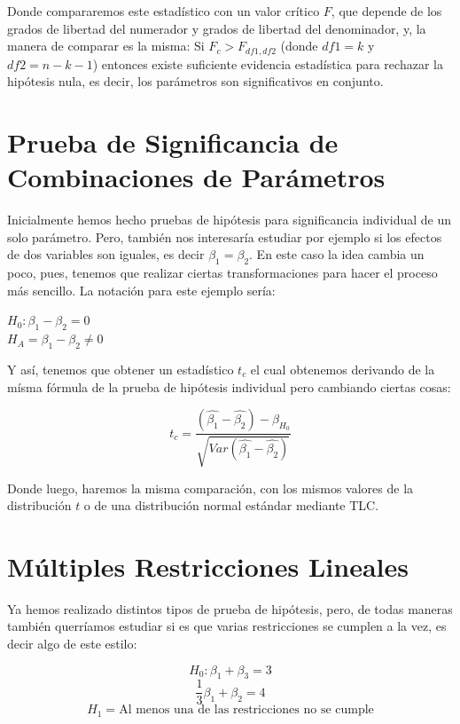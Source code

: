\documentclass[
]{book}
\begin{document}
Donde compararemos este estadístico con un valor crítico \(F\), que depende de los grados de libertad del numerador y grados de libertad del denominador, y, la manera de comparar es la misma: Si \(F_c > F_{df1,df2}\) (donde \(df1 = k\) y \(df2 = n-k-1\)) entonces existe suficiente evidencia estadística para rechazar la hipótesis nula, es decir, los parámetros son significativos en conjunto.

\section{Prueba de Significancia de Combinaciones de Parámetros}\label{prueba-de-significancia-de-combinaciones-de-paruxe1metros}

Inicialmente hemos hecho pruebas de hipótesis para significancia individual de un solo parámetro. Pero, también nos interesaría estudiar por ejemplo si los efectos de dos variables son iguales, es decir \(\beta_1 = \beta_2\). En este caso la idea cambia un poco, pues, tenemos que realizar ciertas transformaciones para hacer el proceso más sencillo. La notación para este ejemplo sería:

\begin{center}
    $H_0: \beta_1 - \beta_2 = 0$\\
    $H_A = \beta_1 - \beta_2 \ne 0$
\end{center}

Y así, tenemos que obtener un estadístico \(t_c\) el cual obtenemos derivando de la mísma fórmula de la prueba de hipótesis individual pero cambiando ciertas cosas:

\[
t_c = \frac{(\widehat{\beta_1} - \widehat{\beta_2}) - \beta_{H_0}}{\sqrt{Var(\widehat{\beta_1} - \widehat{\beta_2})}}
\]

Donde luego, haremos la misma comparación, con los mismos valores de la distribución \(t\) o de una distribución normal estándar mediante TLC.

\section{Múltiples Restricciones Lineales}\label{muxfaltiples-restricciones-lineales}

Ya hemos realizado distintos tipos de prueba de hipótesis, pero, de todas maneras también querríamos estudiar si es que varias restricciones se cumplen a la vez, es decir algo de este estilo:

\[H_0:\beta_1 + \beta_3 = 3\]
\[\frac{1}{3}\beta_1 + \beta_2 = 4\]
\[H_1 = \text{Al menos una de las restricciones no se cumple}\]
\end{document}
